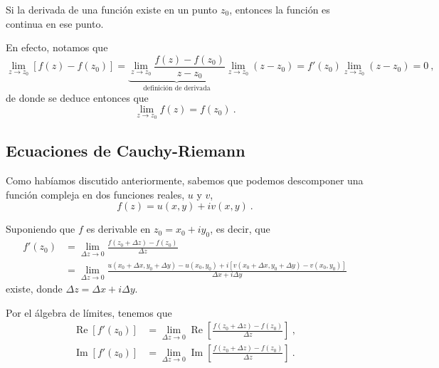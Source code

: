\begin{teorema}
    Si la derivada de una función existe en un punto $z_0$, entonces la función es continua en ese punto.
\end{teorema}

\begin{demo}
    En efecto, notamos que
    \begin{equation*}
        \lim_{z \to z_0}[f(z) - f(z_0)] = \underbrace{\lim_{z \to z_0} \frac{f(z) - f(z_0)}{z-z_0}}_{\text{definición de derivada}} \lim_{z \to z_0} (z-z_0) = f'(z_0) \lim_{z \to z_0} (z-z_0) = 0 \ ,
    \end{equation*}
    de donde se deduce entonces que
    \begin{equation*}
        \lim_{z \to z_0} f(z) = f(z_0) \ .
    \end{equation*}
\end{demo}

\subsection{Ecuaciones de Cauchy-Riemann}

Como habíamos discutido anteriormente, sabemos que podemos descomponer una función compleja en dos funciones reales, $u$ y $v$,
\begin{equation*}
    f(z) = u(x,y) + iv(x,y) \ . 
\end{equation*}

Suponiendo que $f$ es derivable en $z_0 = x_0 + iy_0$, es decir, que
\begin{align*}
    f'(z_0) & = \lim_{\Delta z \to 0} \frac{f(z_0 + \Delta z) - f(z_0)}{\Delta z} \\
    & = \lim_{\Delta z \to 0} \frac{u(x_0 + \Delta x, y_0 + \Delta y) - u(x_0, y_0) + i[v(x_0 + \Delta x, y_0 + \Delta y) - v(x_0, y_0)]}{\Delta x + i \Delta y}
\end{align*}
existe, donde $\Delta z = \Delta x + i \Delta y$.

Por el álgebra de límites, tenemos que
\begin{align*}
    \operatorname{Re}[f'(z_0)] & = \lim_{\Delta z \to 0} \operatorname{Re} \left[ \frac{f(z_0 + \Delta z) - f(z_0)}{\Delta z} \right] \ , \\
    \operatorname{Im}[f'(z_0)] & = \lim_{\Delta z \to 0} \operatorname{Im} \left[ \frac{f(z_0 + \Delta z) - f(z_0)}{\Delta z} \right] \ .
\end{align*}

